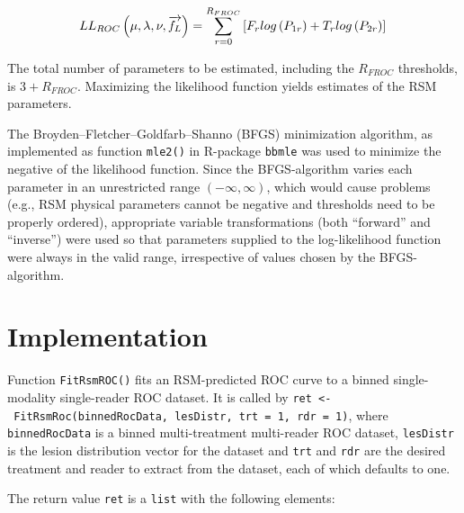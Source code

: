 \documentclass[
]{book}
\begin{document}
\begin{equation}
LL_{ROC} \left ( \mu, \lambda, \nu, \overrightarrow{f_L} \right )= \sum_{r=0}^{R_{FROC}} \left [F_r log \left (P_{1r}  \right ) + T_r log \left (P_{2r}  \right )  \right ] \\
\label{eq:rsm-fitting-roc-ll2}
\end{equation}

The total number of parameters to be estimated, including the \(R_{FROC}\) thresholds, is \(3+R_{FROC}\). Maximizing the likelihood function yields estimates of the RSM parameters.

The Broyden--Fletcher--Goldfarb--Shanno (BFGS) \citep{RN2646, RN2647, RN2648, RN2649, RN2651, RN2650} minimization algorithm, as implemented as function \texttt{mle2()} in R-package \texttt{bbmle} \citep{bbmle} was used to minimize the negative of the likelihood function. Since the BFGS-algorithm varies each parameter in an unrestricted range \((-\infty, \infty)\), which would cause problems (e.g., RSM physical parameters cannot be negative and thresholds need to be properly ordered), appropriate variable transformations (both ``forward'' and ``inverse'') were used so that parameters supplied to the log-likelihood function were always in the valid range, irrespective of values chosen by the BFGS-algorithm.

\hypertarget{rsm-fitting-fitrsmroc-implementation}{%
\section{Implementation}\label{rsm-fitting-fitrsmroc-implementation}}

Function \texttt{FitRsmROC()} fits an RSM-predicted ROC curve to a binned single-modality single-reader ROC dataset. It is called by \texttt{ret\ \textless{}-\ FitRsmRoc(binnedRocData,\ lesDistr,\ trt\ =\ 1,\ rdr\ =\ 1)}, where \texttt{binnedRocData} is a binned multi-treatment multi-reader ROC dataset, \texttt{lesDistr} is the lesion distribution vector for the dataset and \texttt{trt} and \texttt{rdr} are the desired treatment and reader to extract from the dataset, each of which defaults to one.

The return value \texttt{ret} is a \texttt{list} with the following elements:
\end{document}
